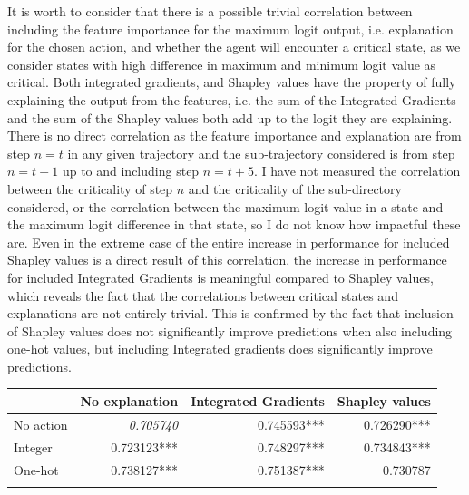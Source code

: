 \documentclass[UKenglish]{uiomasterthesis}
\begin{document}
It is worth to consider that there is a possible trivial correlation between including the feature importance for the maximum logit output, i.e. explanation for the chosen action, and whether the agent will encounter a critical state, as we consider states with high difference in maximum and minimum logit value as critical. Both integrated gradients, and Shapley values have the property of fully explaining the output from the features, i.e. the sum of the Integrated Gradients and the sum of the Shapley values both add up to the logit they are explaining. There is no direct correlation as the feature importance and explanation are from step $n = t$ in any given trajectory and the sub-trajectory considered is from step $n=t+1$ up to and including step $n=t+5$. I have not measured the correlation between the criticality of step $n$ and the criticality of the sub-directory considered, or the correlation between the maximum logit value in a state and the maximum logit difference in that state, so I do not know how impactful these are. Even in the extreme case of the entire increase in performance for included Shapley values is a direct result of this correlation, the increase in performance for included Integrated Gradients is meaningful compared to Shapley values, which reveals the fact that the correlations between critical states and explanations are not entirely trivial. This is confirmed by the fact that inclusion of Shapley values does not significantly improve predictions when also including one-hot values, but including Integrated gradients does significantly improve predictions.

\begin{center}
\label{tab:crit_simpl_log}
\begin{tabular}{lrrr}
\toprule
& No explanation & Integrated Gradients & Shapley values \\
\midrule
No action & \textit{0.705740} & 0.745593*** & 0.726290*** \\
Integer & 0.723123*** & 0.748297*** & 0.734843*** \\
One-hot & 0.738127*** & 0.751387*** & 0.730787 \\
\bottomrule
\addlinespace[2pt]
\multicolumn{3}{l}{\textsuperscript{***}$p<0.001$, 
  \textsuperscript{**}$p<0.01$, 
  \textsuperscript{*}$p<0.05$}
\end{tabular}
\end{center}
\end{document}
